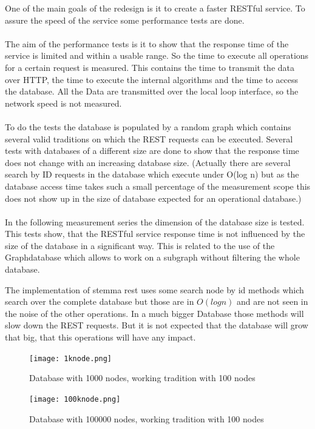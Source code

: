 \documentclass[11pt,fleqn,openany]{book} %
\begin{document}
One of the main goals of the redesign is it to create a faster RESTful service. To assure the speed of the service some performance tests are done. 
\\ \quad \\
The aim of the performance tests is it to show that the response time of the service is limited and within a usable range. So the time to execute all operations for a certain request is measured. This contains the time to transmit the data over HTTP, the time to execute the internal algorithms and the time to access the database. All the Data are transmitted over the local loop interface, so the network speed is not measured. 
\\ \quad \\
To do the tests the database is populated by a random graph which contains several valid traditions on which the REST requests can be executed. Several tests with databases of a different size are done to show that the response time does not change with an increasing database size. (Actually there are several search by ID requests in the database which execute under O(log n) but as the database access time takes such a small percentage of the measurement scope this does not show up in the size of database expected for an operational database.)
\\ \quad \\
In the following measurement series the dimension of the database size is tested. This tests show, that the RESTful service response time is not influenced by the size of the database in a significant way. This is related to the use of the Graphdatabase which allows to work on a subgraph without filtering the whole database. 
\begin{remark}
The implementation of stemma rest uses some search node by id methods which search over the complete database but those are in $O(log n)$ and are not seen in the noise of the other operations. In a much bigger Database those methods will slow down the REST requests. But it is not expected that the database will grow that big, that this operations will have any impact.
\end{remark} 

\begin{figure}[h!]
  \caption{Database with 1000 nodes,  working tradition with 100 nodes }
  \centering
    \texttt{[image: 1knode.png]}
\end{figure}

\begin{figure}[h!]
  \caption{Database with 100000 nodes,  working tradition with 100 nodes }
  \centering
    \texttt{[image: 100knode.png]}
\end{figure}
\end{document}
